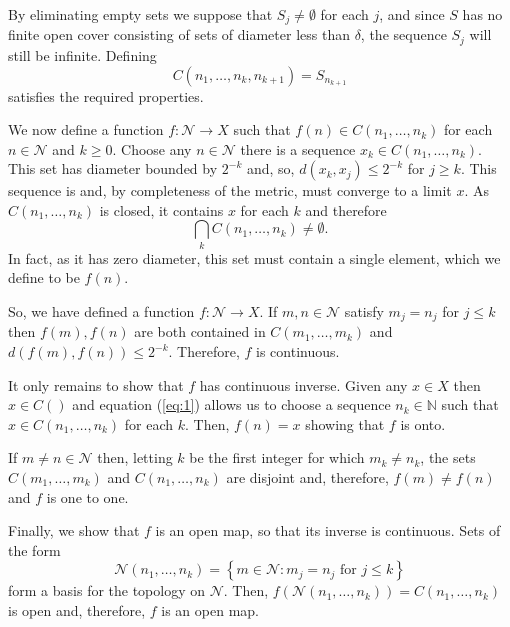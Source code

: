 \documentclass[12pt]{article}
\begin{document}
By eliminating empty sets we suppose that $S_j\not=\emptyset$ for each $j$, and since $S$ has no finite open cover consisting of sets of diameter less than $\delta$, the sequence $S_j$ will still be infinite. Defining
\begin{equation*}
C(n_1,\ldots,n_k,n_{k+1})=S_{n_{k+1}}
\end{equation*}
satisfies the required properties.


We now define a function $f\colon\mathcal{N}\rightarrow X$ such that $f(n)\in C(n_1,\ldots,n_k)$ for each $n\in\mathcal{N}$ and $k\ge 0$.
Choose any $n\in\mathcal{N}$ there is a sequence $x_k\in C(n_1,\ldots,n_k)$. This set has diameter bounded by $2^{-k}$ and, so, $d(x_k,x_j)\le 2^{-k}$ for $j\ge k$. This sequence is  and, by completeness of the metric, must converge to a limit $x$. As $C(n_1,\ldots,n_k)$ is closed, it contains $x$ for each $k$ and therefore
\begin{equation*}
\bigcap_kC(n_1,\ldots,n_k)\not=\emptyset.
\end{equation*}
In fact, as it has zero diameter, this set must contain a single element, which we define to be $f(n)$.

So, we have defined a function $f\colon\mathcal{N}\rightarrow X$. If $m,n\in \mathcal{N}$ satisfy $m_j=n_j$ for $j\le k$ then $f(m),f(n)$ are both contained in $C(m_1,\ldots,m_k)$ and $d(f(m),f(n))\le 2^{-k}$. Therefore, $f$ is continuous.

It only remains to show that $f$ has continuous inverse. Given any $x\in X$ then $x\in C()$ and equation (\ref{eq:1}) allows us to choose a sequence $n_k\in\mathbb{N}$ such that $x\in C(n_1,\ldots,n_k)$ for each $k$. Then, $f(n)=x$ showing that $f$ is onto.

If $m\not=n\in\mathcal{N}$ then, letting $k$ be the first integer for which $m_k\not=n_k$, the sets $C(m_1,\ldots,m_k)$ and $C(n_1,\ldots,n_k)$ are disjoint and, therefore, $f(m)\not=f(n)$ and $f$ is one to one.

Finally, we show that $f$ is an open map, so that its inverse is continuous. Sets of the form
\begin{equation*}
\mathcal{N}(n_1,\ldots,n_k)=\left\{m\in\mathcal{N}\colon m_j=n_j\text{ for }j\le k\right\}
\end{equation*}
form a basis for the topology on $\mathcal{N}$. Then, $f\left(\mathcal{N}(n_1,\ldots,n_k)\right)=C(n_1,\ldots,n_k)$ is open and, therefore, $f$ is an open map.

\end{document}
